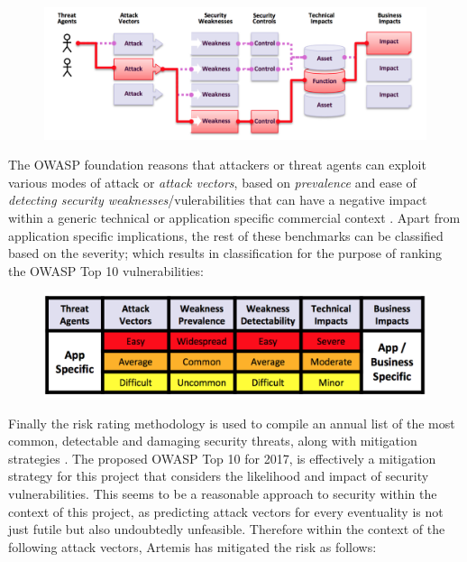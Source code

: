 \begin{figure}[H]
	\centering
	\includegraphics[scale=0.5]{figures/attack}
	\label{fig:Consideration of Threat Agents}
\end{figure}

The OWASP foundation reasons \cite{OWASP2017} that attackers or threat agents can exploit various modes of attack or \textit{attack vectors}, based on \textit{prevalence} and ease of \textit{detecting security weaknesses}/vulerabilities that can have a negative impact  within a generic technical or application specific commercial context \cite{OWASP2017}. Apart from application specific implications, the rest of these benchmarks can be classified based on the severity; which results in classification for the purpose of ranking the OWASP Top 10 vulnerabilities:

\begin{figure}[H]
	\centering
	\includegraphics[scale=0.85]{figures/tabulation}
	\label{fig:OWASP Risk Rating Methodology}
\end{figure}

Finally the risk rating methodology is used to compile an annual list of the most common, detectable and damaging security threats, along with mitigation strategies \cite{OWASP2017}. The proposed OWASP Top 10 for 2017, is effectively a mitigation strategy for this project that considers the likelihood and impact of security vulnerabilities. This seems to be a reasonable approach to security within the context of this project, as predicting attack vectors for every eventuality is not just futile but also undoubtedly unfeasible. Therefore within the context of the following attack vectors, Artemis has mitigated the risk as follows:

